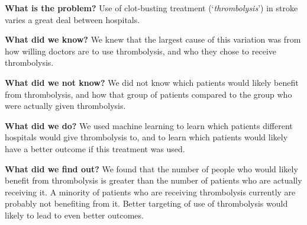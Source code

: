 \textbf{What is the problem?} Use of clot-busting treatment (`\textit{thrombolysis}') in stroke varies a great deal between hospitals.

\textbf{What did we know?} We knew that the largest cause of this variation was from how willing doctors are to use thrombolysis, and who they chose to receive thrombolysis.

\textbf{What did we not know?} We did not know which patients would likely benefit from thrombolysis, and how that group of patients compared to the group who were actually given thrombolysis.

\textbf{What did we do?} We used machine learning to learn which patients different hospitals would give thrombolysis to, and to learn which patients would likely have a better outcome if this treatment was used.

\textbf{What did we find out?} We found that the number of people who would likely benefit from thrombolysis is greater than the number of patients who are actually receiving it. A minority of patients who are receiving thrombolysis currently are probably not benefiting from it. Better targeting of use of thrombolysis would likely to lead to even better outcomes.
